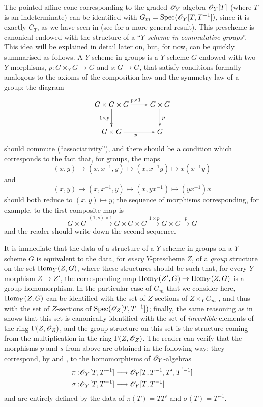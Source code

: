 \begin{remark}[8.3.9]
\label{II.8.3.9}
The pointed affine cone corresponding to the graded $\mathscr{O}_Y$-algebra $\mathscr{O}_Y[T]$ (where $T$ is an indeterminate) can be identified with $G_m=\operatorname{Spec}(\mathscr{O}_Y[T,T^{-1}])$, since it is exactly $C_T$, as we have seen in  (see  for a more general result).
This prescheme is canonical endowed with the structure of a ``\emph{$Y$-scheme in commutative groups}''.
This idea will be explained in detail later on, but, for now, can be quickly summarised as follows.
A $Y$-scheme in groups is a $Y$-scheme $G$ endowed with two $Y$-morphisms, $p:G\times_Y G\to G$ and $s:G\to G$, that satisfy conditions formally analogous to the axioms of the composition law and the symmetry law of a group: the diagram
\[
  \xymatrix{
    G \times G \times G
      \ar[r]^{p \times 1}
      \ar[d]_{1 \times p}
  & G \times G
      \ar[d]^{p}
  \\G \times G
      \ar[r]_{p}
  & G
  }
\]
should commute (``associativity''), and there should be a condition which corresponds to the fact that, for groups, the maps
\[
  (x,y)
  \mapsto
  (x,x^{-1},y)
  \mapsto
  (x,x^{-1}y)
  \mapsto
  x(x^{-1}y)
\]
and
\[
  (x,y)
  \mapsto
  (x,x^{-1},y)
  \mapsto
  (x,yx^{-1})
  \mapsto
  (yx^{-1})x
\]
should both reduce to $(x,y)\mapsto y$;
the sequence of morphisms corresponding, for example, to the first composite map is
\[
  G \times G
  \xrightarrow{(1,s) \times 1}
  G \times G \times G
  \xrightarrow{1 \times p}
  G\times G
  \xrightarrow{p}
  G
\]
and the reader should write down the second sequence.

It is immediate  that the data of a structure of a $Y$-scheme in groups on a $Y$-scheme $G$ is equivalent to the data, for \emph{every} $Y$-prescheme $Z$, of a \emph{group} structure on the set $\operatorname{Hom}_Y(Z,G)$, where these structures should be such that, for every $Y$-morphism $Z\to Z'$, the corresponding map $\Hom_Y(Z',G)\to\Hom_Y(Z,G)$ is a group homomorphism.
In the particular case of $G_m$ that we consider here, $\operatorname{Hom}_Y(Z,G)$ can be identified with the set of $Z$-sections of $Z\times_Y G_m$ , and thus with the set of $Z$-sections of $\operatorname{Spec}(\mathscr{O}_Z[T,T^{-1}])$;
finally, the same reasoning as in  shows that this set is canonically identified with the set of \emph{invertible} elements of the ring $\Gamma(Z,\mathscr{O}_Z)$, and the group structure on this set is the structure coming from the multiplication in the ring $\Gamma(Z,\mathscr{O}_Z)$.
The reader can verify that the morphisms $p$ and $s$ from above are obtained in the following way: they correspond, by  and , to the homomorphisms of $\mathscr{O}_Y$-algebras
\begin{align*}
  \pi: &\sh{O}_Y[T,T^{-1}] \to \sh{O}_Y[T,T^{-1},T',T^{'-1}]
\\\sigma: &\sh{O}_Y[T,T^{-1}] \to \sh{O}_Y[T,T^{-1}]
\end{align*}
and are entirely defined by the data of $\pi(T)=TT'$ and $\sigma(T)=T^{-1}$.


\end{remark}
